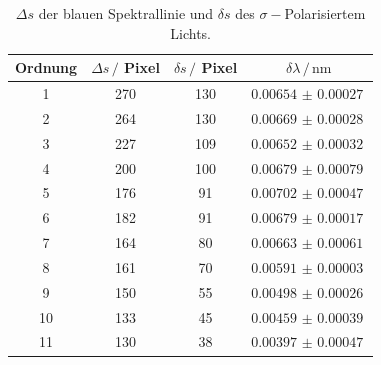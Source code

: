 \begin{table}
    \centering
    \caption{$\Delta s$ der blauen Spektrallinie und $\delta s$ des $\sigma -$Polarisiertem Lichts.}
    \begin{tabular}{cccc}
        \toprule
        Ordnung & $\Delta s \, / $ Pixel & $\delta s \, / $ Pixel & $\delta \lambda \, / \,\si{\nano\meter}$ \\
        \midrule
        1   &   270  &    130   & $\SI{0.00654(27)}{}$   \\
        2   &   264  &    130   & $\SI{0.00669(28)}{}$   \\
        3   &   227  &    109   & $\SI{0.00652(32)}{}$   \\
        4   &   200  &    100   & $\SI{0.00679(79)}{}$   \\
        5   &   176  &    91    & $\SI{0.00702(47)}{}$   \\
        6   &   182  &    91    & $\SI{0.00679(17)}{}$   \\
        7   &   164  &    80    & $\SI{0.00663(61)}{}$   \\
        8   &   161  &    70    & $\SI{0.00591(03)}{}$   \\
        9   &   150  &    55    & $\SI{0.00498(26)}{}$   \\
        10  &   133  &    45    & $\SI{0.00459(39)}{}$   \\
        11  &   130  &    38    & $\SI{0.00397(47)}{}$   \\
        \bottomrule
    \end{tabular}
    \label{tab:blau-sigma}
\end{table}

